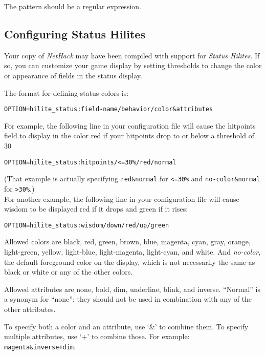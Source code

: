 The pattern should be a regular expression.

\subsection*{Configuring Status Hilites}

Your copy of {\it NetHack\/} may have been compiled with support
for {\it Status Hilites}.
If so, you can customize your game display by setting thresholds to
change the color or appearance of fields in the status display.

The format for defining status colors is:\\
\begin{verbatim}
OPTION=hilite_status:field-name/behavior/color&attributes
\end{verbatim}

For example, the following line in your configuration file will cause
the hitpoints field to display in the color red if your hitpoints
drop to or below a threshold of 30%
\begin{verbatim}
OPTION=hilite_status:hitpoints/<=30%/red/normal
\end{verbatim}
(That example is actually specifying {\tt red\&normal} for  {\tt <=30\%}
and {\tt no-color\&normal} for {\tt >30\%}.)\\

For another example, the following line in your configuration file will cause
wisdom to be displayed red if it drops and green if it rises:\\
\begin{verbatim}
OPTION=hilite_status:wisdom/down/red/up/green
\end{verbatim}

Allowed colors are black, red, green, brown, blue, magenta, cyan, gray,
orange, light-green, yellow, light-blue, light-magenta, light-cyan, and white.
And {\it no-color}, the default foreground color on the display, which
is not necessarily the same as black or white or any of the other colors.

Allowed attributes are none, bold, dim, underline, blink, and inverse.
``Normal'' is a synonym for ``none''; they should not be used in
combination with any of the other attributes.

To specify both a color and an attribute, use `\&' to combine them.
To specify multiple attributes, use `+' to combine those.
For example: {\tt magenta\&inverse+dim}.

